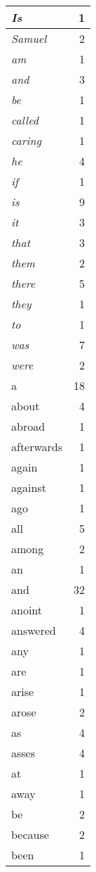 \begin{center}
\begin{longtable}{l|r}
\emph{Is} & 1 \\ \hline
\emph{Samuel} & 2 \\ \hline
\emph{am} & 1 \\ \hline
\emph{and} & 3 \\ \hline
\emph{be} & 1 \\ \hline
\emph{called} & 1 \\ \hline
\emph{caring} & 1 \\ \hline
\emph{he} & 4 \\ \hline
\emph{if} & 1 \\ \hline
\emph{is} & 9 \\ \hline
\emph{it} & 3 \\ \hline
\emph{that} & 3 \\ \hline
\emph{them} & 2 \\ \hline
\emph{there} & 5 \\ \hline
\emph{they} & 1 \\ \hline
\emph{to} & 1 \\ \hline
\emph{was} & 7 \\ \hline
\emph{were} & 2 \\ \hline
a & 18 \\ \hline
about & 4 \\ \hline
abroad & 1 \\ \hline
afterwards & 1 \\ \hline
again & 1 \\ \hline
against & 1 \\ \hline
ago & 1 \\ \hline
all & 5 \\ \hline
among & 2 \\ \hline
an & 1 \\ \hline
and & 32 \\ \hline
anoint & 1 \\ \hline
answered & 4 \\ \hline
any & 1 \\ \hline
are & 1 \\ \hline
arise & 1 \\ \hline
arose & 2 \\ \hline
as & 4 \\ \hline
asses & 4 \\ \hline
at & 1 \\ \hline
away & 1 \\ \hline
be & 2 \\ \hline
because & 2 \\ \hline
been & 1 \\ \hline

\end{longtable}
\end{center}
